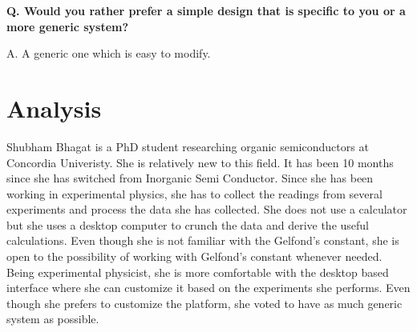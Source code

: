 \documentclass{article}
\begin{document}
\textbf{Q. Would you rather prefer a simple design that is specific to you or a more generic system?}

A. A generic one which is easy to modify.

\section{Analysis}
\justifying
Shubham Bhagat is a PhD student researching organic semiconductors at Concordia Univeristy. She is relatively new to this field. It has been 10 months since she has switched from Inorganic Semi Conductor. Since she has been working in experimental physics, she has to collect the readings from several experiments and process the data she has collected. She does not use a calculator but she uses a desktop computer to crunch the data and derive the useful calculations. Even though she is not familiar with the Gelfond's constant, she is open to the possibility of working with Gelfond's constant whenever needed. Being experimental physicist, she is more comfortable with the desktop based interface where she can customize it based on the experiments she performs. Even though she prefers to customize the platform, she voted to have as much generic system as possible.
\end{document}
